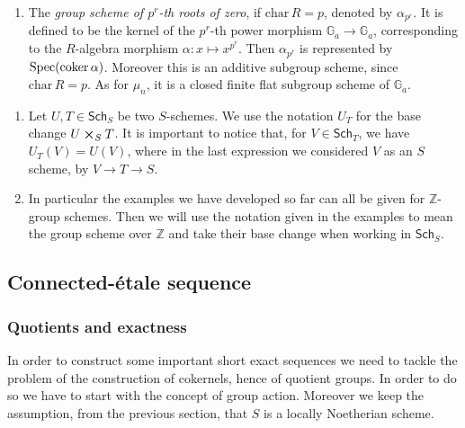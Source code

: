 \documentclass[../Main]{subfiles}
\begin{document}
\begin{ex}
\begin{enumerate}
		\item The {\em group scheme of $p^r$-th roots of zero},
			if $\mathrm{char}\, R = p$, denoted by $\alpha_{p^r}$. 
			It is defined to be the kernel of the $p^r$-th power
			morphism $\mathbb{G}_a \to \mathbb{G}_a$,
			corresponding to the $R$-algebra morphism
			$\alpha\colon x \mapsto x^{p^r}$.
			Then $\alpha_{p^r}$ is represented by $\mathrm{Spec}(\operatorname{coker} \alpha)$.
			Moreover this is an additive subgroup scheme, since $\mathrm{char}\, R = p$.
			As for $\mu_n$, it is a closed finite flat subgroup scheme of 
			$\mathbb{G}_a$.
	\end{enumerate}
\end{ex}


\begin{rem}\leavevmode\vspace{-\baselineskip}
\begin{enumerate}
\item 	Let $U, T \in \mathsf{Sch}_{ S }$ be two $S$-schemes.
	We use the notation $U_T$ for the base change $U \cross_{ S } T$.
	It is important to notice that, for $V \in \mathsf{Sch}_{ T }$, we 
	have $U_T(V) = U(V)$, where in the last expression
	we considered $V$ as an $S$ scheme, by $V \to T \to S$.


\item	In particular the examples we have developed so far 
	can all be given for $\mathbb{Z}$-group schemes.
	Then we will use the notation given in the examples
	to mean the group scheme over $\mathbb{Z}$
	and take their base change when working in $\mathsf{Sch}_{ S }$.
\end{enumerate}
\end{rem}


\subsection{Connected-étale sequence}
\subsubsection{Quotients and exactness}
In order to construct some important short exact sequences
we need to tackle the problem of the construction
of cokernels, hence of quotient groups.
In order to do so we have to start with the concept of group action.
Moreover we keep the assumption, from the previous section, that $S$
is a locally Noetherian scheme.
\end{document}
